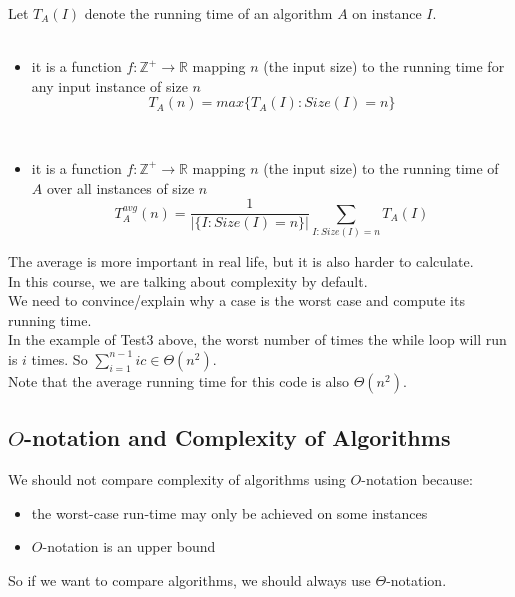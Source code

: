 \documentclass[letterpaper, 12pt]{article}
\newcommand{\red}[1]{{\color{red}{#1}}}
\begin{document}
    Let $T_A(I)$ denote the running time of an algorithm $A$ on instance $I$.\\
    \bigskip
    \textbf{\red{Worst-case complexity of an algorithm}}\\
    \begin{itemize}
        \item it is a function $f: \mathbb{Z}^+ \rightarrow \mathbb{R}$ mapping $n$ (the input size) to
        the \red{longest} running time for any input instance of size $n$
        $$T_A(n) = max\{T_A(I):Size(I) = n\}$$
    \end{itemize}
    \textbf{\red{Average-case complexity of an algorithm}}\\
    \begin{itemize}
        \item it is a function $f: \mathbb{Z}^+ \rightarrow \mathbb{R}$ mapping $n$ (the input size) to 
        the \red{average} running time of $A$ over all instances of size $n$
        $$T_A^{avg}(n) = \frac{1}{|\{I:Size(I) = n\}|}\sum_{I:Size(I) = n}T_A(I)$$
    \end{itemize}
    \bigskip
    The average is more important in real life, but it is also harder to calculate.\\
    In this course, we are talking about \textbf{\red{worst case}} complexity by default.\\
    \bigskip
    We need to convince/explain why a case is the worst case and compute its running time.\\
    \bigskip
    In the example of Test3 above, the worst number of times the while loop will run is $i$ 
    times. So $\sum_{i = 1}^{n-1}ic \in \Theta(n^2)$.\\
    Note that the average running time for this code is also $\Theta(n^2)$.
    \pagebreak

    \subsection{$O$-notation and Complexity of Algorithms}
    We should not compare complexity of algorithms using $O$-notation because:
    \begin{itemize}
        \item the worst-case run-time may only be achieved on some instances
        \item $O$-notation is an upper bound
    \end{itemize}
    So if we want to compare algorithms, we should always use $\Theta$-notation.
    
\end{document}
